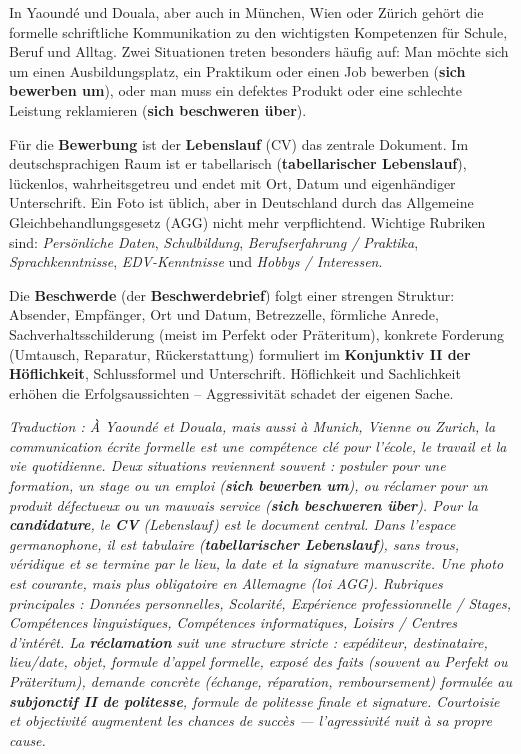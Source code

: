 \documentclass[11pt]{article}
\begin{document}
\begin{textebox}
In Yaoundé und Douala, aber auch in München, Wien oder Zürich gehört die formelle schriftliche Kommunikation zu den wichtigsten Kompetenzen für Schule, Beruf und Alltag. Zwei Situationen treten besonders häufig auf: Man möchte sich um einen Ausbildungsplatz, ein Praktikum oder einen Job bewerben (\textbf{sich bewerben um}), oder man muss ein defektes Produkt oder eine schlechte Leistung reklamieren (\textbf{sich beschweren über}).

Für die \textbf{Bewerbung} ist der \textbf{Lebenslauf} (CV) das zentrale Dokument. Im deutschsprachigen Raum ist er tabellarisch (\textbf{tabellarischer Lebenslauf}), lückenlos, wahrheitsgetreu und endet mit Ort, Datum und eigenhändiger Unterschrift. Ein Foto ist üblich, aber in Deutschland durch das Allgemeine Gleichbehandlungsgesetz (AGG) nicht mehr verpflichtend. Wichtige Rubriken sind: \textit{Persönliche Daten}, \textit{Schulbildung}, \textit{Berufserfahrung / Praktika}, \textit{Sprachkenntnisse}, \textit{EDV-Kenntnisse} und \textit{Hobbys / Interessen}.

Die \textbf{Beschwerde} (der \textbf{Beschwerdebrief}) folgt einer strengen Struktur: Absender, Empfänger, Ort und Datum, Betrezzelle, förmliche Anrede, Sachverhaltsschilderung (meist im Perfekt oder Präteritum), konkrete Forderung (Umtausch, Reparatur, Rückerstattung) formuliert im \textbf{Konjunktiv II der Höflichkeit}, Schlussformel und Unterschrift. Höflichkeit und Sachlichkeit erhöhen die Erfolgsaussichten – Aggressivität schadet der eigenen Sache.

\emph{Traduction : À Yaoundé et Douala, mais aussi à Munich, Vienne ou Zurich, la communication écrite formelle est une compétence clé pour l'école, le travail et la vie quotidienne. Deux situations reviennent souvent : postuler pour une formation, un stage ou un emploi (\textbf{sich bewerben um}), ou réclamer pour un produit défectueux ou un mauvais service (\textbf{sich beschweren über}). Pour la \textbf{candidature}, le \textbf{CV} (Lebenslauf) est le document central. Dans l'espace germanophone, il est tabulaire (\textbf{tabellarischer Lebenslauf}), sans trous, véridique et se termine par le lieu, la date et la signature manuscrite. Une photo est courante, mais plus obligatoire en Allemagne (loi AGG). Rubriques principales : \textit{Données personnelles}, \textit{Scolarité}, \textit{Expérience professionnelle / Stages}, \textit{Compétences linguistiques}, \textit{Compétences informatiques}, \textit{Loisirs / Centres d'intérêt}. La \textbf{réclamation} suit une structure stricte : expéditeur, destinataire, lieu/date, objet, formule d'appel formelle, exposé des faits (souvent au Perfekt ou Präteritum), demande concrète (échange, réparation, remboursement) formulée au \textbf{subjonctif II de politesse}, formule de politesse finale et signature. Courtoisie et objectivité augmentent les chances de succès — l'agressivité nuit à sa propre cause.}
\end{textebox}
\end{document}
